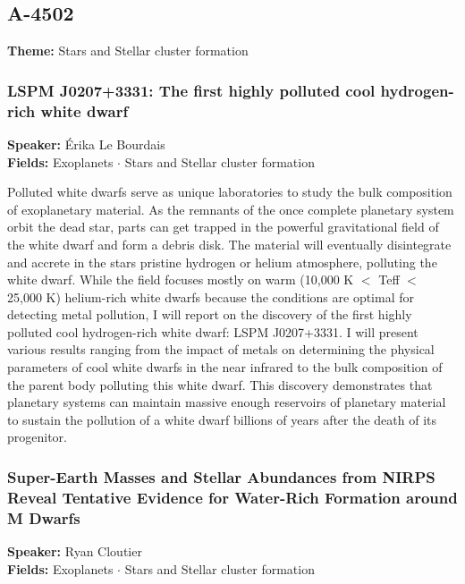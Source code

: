 \subsection*{A-4502}
\textbf{Theme:} Stars and Stellar cluster formation

\hypertarget{abstract-talk-26}{}\label{abstract-page-talk-26}
\subsubsection*{LSPM J0207+3331: The first highly polluted cool hydrogen-rich white dwarf}
\textbf{Speaker:} Érika Le Bourdais\\
\textbf{Fields:} Exoplanets $\cdot$ Stars and Stellar cluster formation

Polluted white dwarfs serve as unique laboratories to study the bulk composition of exoplanetary material. As the remnants of the once complete planetary system orbit the dead star, parts can get trapped in the powerful gravitational field of the white dwarf and form a debris disk. The material will eventually disintegrate and accrete in the stars pristine hydrogen or helium atmosphere, polluting the white dwarf. While the field focuses mostly on warm (10,000 K $<$ Teff $<$ 25,000 K) helium-rich white dwarfs because the conditions are optimal for detecting metal pollution, I will report on the discovery of the first highly polluted cool hydrogen-rich white dwarf: LSPM J0207+3331. I will present various results ranging from the impact of metals on determining the physical parameters of cool white dwarfs in the near infrared to the bulk composition of the parent body polluting this white dwarf. This discovery demonstrates that planetary systems can maintain massive enough reservoirs of planetary material to sustain the pollution of a white dwarf billions of years after the death of its progenitor.

\hypertarget{abstract-talk-28}{}\label{abstract-page-talk-28}
\subsubsection*{Super-Earth Masses and Stellar Abundances from NIRPS Reveal Tentative Evidence for Water-Rich Formation around M Dwarfs}
\textbf{Speaker:} Ryan Cloutier\\
\textbf{Fields:} Exoplanets $\cdot$ Stars and Stellar cluster formation

